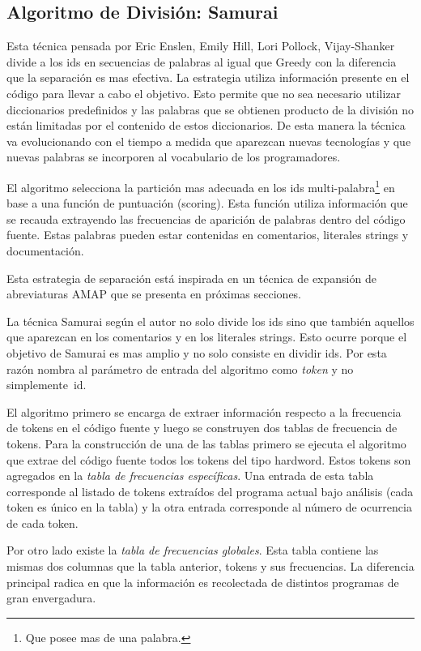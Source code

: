 \documentclass[a4paper,12pt]{report}
\begin{document}
\subsection{Algoritmo de División: Samurai}

Esta técnica pensada por Eric Enslen, Emily Hill, Lori Pollock, Vijay-Shanker\cite{EHPV09} divide a los ids en secuencias de palabras al igual que Greedy con la diferencia que la separación es mas efectiva. La estrategia utiliza información presente en el código para llevar a cabo el objetivo. Esto permite que no sea necesario utilizar diccionarios predefinidos y las palabras que se obtienen producto de la división no están limitadas por el contenido de estos diccionarios. De esta manera la técnica va evolucionando con el tiempo a medida que aparezcan nuevas tecnologías y que nuevas palabras se incorporen al vocabulario de los programadores.

El algoritmo selecciona la partición mas adecuada en los ids multi-palabra\footnote[1]{Que posee mas de una palabra.} en base a una función de puntuación (scoring). Esta función utiliza información que se recauda extrayendo las frecuencias de aparición de palabras dentro del código fuente. Estas palabras pueden estar contenidas en comentarios, literales strings y documentación.

Esta estrategia de separación está inspirada en un técnica de expansión de abreviaturas AMAP\cite{EZH08} que se presenta en próximas secciones.

La técnica Samurai según el autor\cite{EHPV09} no solo divide los ids sino que también aquellos que aparezcan en los comentarios y en los literales strings. Esto ocurre porque el objetivo de Samurai es mas amplio y no solo consiste en dividir ids. Por esta razón nombra al parámetro de entrada del algoritmo como \textit{token} y no \mbox{simplemente id.}

El algoritmo primero se encarga de extraer información respecto a la frecuencia de tokens en el código fuente y luego se construyen dos tablas de frecuencia de tokens. Para la construcción de una de las tablas primero se ejecuta el algoritmo que extrae del código fuente todos los tokens del tipo hardword. Estos tokens son agregados en la \textit{tabla de frecuencias específicas}. Una entrada de esta tabla corresponde al listado de tokens extraídos del programa actual bajo análisis (cada token es único en la tabla) y la otra entrada corresponde al número de ocurrencia de cada token. 

Por otro lado existe la \textit{tabla de frecuencias globales}. Esta tabla contiene las mismas dos columnas que la tabla anterior, tokens y sus frecuencias. La diferencia principal radica en que la información es recolectada de distintos programas de gran envergadura. 
\end{document}
